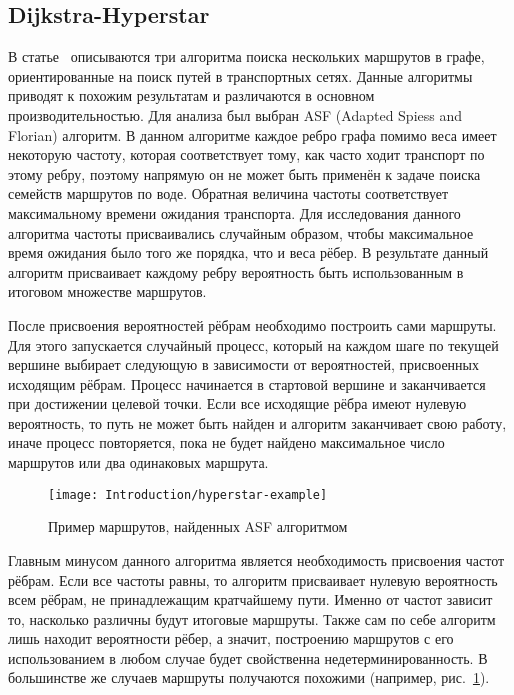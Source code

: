 \FloatBarrier

\subsection{Dijkstra-Hyperstar}

\label{subsec:dijkstra-hyperstar}

В статье~\cite{mafast} описываются три алгоритма поиска нескольких
маршрутов в графе, ориентированные на поиск путей в транспортных
сетях. Данные алгоритмы приводят к похожим результатам и различаются в
основном производительностью. Для анализа был выбран ASF (Adapted
Spiess and Florian) алгоритм. В данном алгоритме каждое ребро графа
помимо веса имеет некоторую частоту, которая соответствует тому, как
часто ходит транспорт по этому ребру, поэтому напрямую он не может
быть применён к задаче поиска семейств маршрутов по воде. Обратная
величина частоты соответствует максимальному времени ожидания
транспорта. Для исследования данного алгоритма частоты присваивались
случайным образом, чтобы максимальное время ожидания было того же
порядка, что и веса рёбер. В результате данный алгоритм присваивает
каждому ребру вероятность быть использованным в итоговом множестве
маршрутов.

После присвоения вероятностей рёбрам необходимо построить сами
маршруты. Для этого запускается случайный процесс, который на каждом
шаге по текущей вершине выбирает следующую в зависимости от
вероятностей, присвоенных исходящим рёбрам. Процесс начинается в
стартовой вершине и заканчивается при достижении целевой точки. Если
все исходящие рёбра имеют нулевую вероятность, то путь не может быть
найден и алгоритм заканчивает свою работу, иначе процесс повторяется,
пока не будет найдено максимальное число маршрутов или два одинаковых
маршрута.

\begin{figure}
    \texttt{[image: Introduction/hyperstar-example]}
    \caption{Пример маршрутов, найденных ASF алгоритмом}
    \label{fig:asf}
\end{figure}

Главным минусом данного алгоритма является необходимость присвоения
частот рёбрам. Если все частоты равны, то алгоритм присваивает нулевую
вероятность всем рёбрам, не принадлежащим кратчайшему пути. Именно от
частот зависит то, насколько различны будут итоговые маршруты. Также
сам по себе алгоритм лишь находит вероятности рёбер, а значит,
построению маршрутов с его использованием в любом случае будет
свойственна недетерминированность. В большинстве же случаев маршруты
получаются похожими (например, рис.~\ref{fig:asf}).

